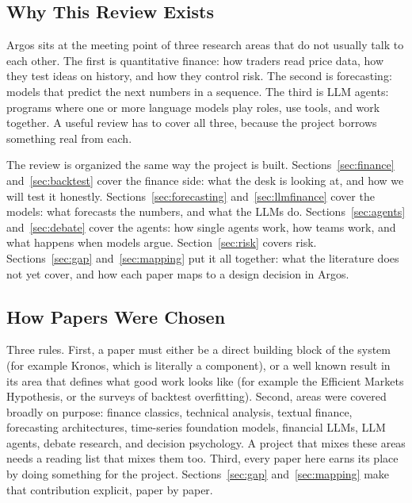 \documentclass[conference]{IEEEtran}
\newcommand{\sys}{Argos}
\begin{document}
\subsection{Why This Review Exists}

\sys{} sits at the meeting point of three research areas that do not usually talk to each other. The first is quantitative finance: how traders read price data, how they test ideas on history, and how they control risk. The second is forecasting: models that predict the next numbers in a sequence. The third is LLM agents: programs where one or more language models play roles, use tools, and work together. A useful review has to cover all three, because the project borrows something real from each.

The review is organized the same way the project is built. Sections~\ref{sec:finance} and~\ref{sec:backtest} cover the finance side: what the desk is looking at, and how we will test it honestly. Sections~\ref{sec:forecasting} and~\ref{sec:llmfinance} cover the models: what forecasts the numbers, and what the LLMs do. Sections~\ref{sec:agents} and~\ref{sec:debate} cover the agents: how single agents work, how teams work, and what happens when models argue. Section~\ref{sec:risk} covers risk. Sections~\ref{sec:gap} and~\ref{sec:mapping} put it all together: what the literature does not yet cover, and how each paper maps to a design decision in \sys{}.

\subsection{How Papers Were Chosen}

Three rules. First, a paper must either be a direct building block of the system (for example Kronos, which is literally a component), or a well known result in its area that defines what good work looks like (for example the Efficient Markets Hypothesis, or the surveys of backtest overfitting). Second, areas were covered broadly on purpose: finance classics, technical analysis, textual finance, forecasting architectures, time-series foundation models, financial LLMs, LLM agents, debate research, and decision psychology. A project that mixes these areas needs a reading list that mixes them too. Third, every paper here earns its place by doing something for the project. Sections~\ref{sec:gap} and~\ref{sec:mapping} make that contribution explicit, paper by paper.

\end{document}
